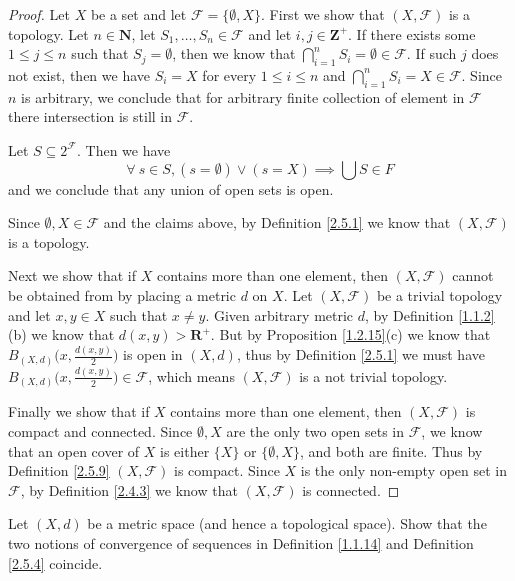 \begin{proof}
    Let \(X\) be a set and let \(\mathcal{F} = \{\emptyset, X\}\).
    First we show that \((X, \mathcal{F})\) is a topology.
    Let \(n \in \mathbf{N}\), let \(S_1, \dots, S_n \in \mathcal{F}\) and let \(i, j \in \mathbf{Z}^+\).
    If there exists some \(1 \leq j \leq n\) such that \(S_j = \emptyset\), then we know that \(\bigcap_{i = 1}^n S_i = \emptyset \in \mathcal{F}\).
    If such \(j\) does not exist, then we have \(S_i = X\) for every \(1 \leq i \leq n\) and \(\bigcap_{i = 1}^n S_i = X \in \mathcal{F}\).
    Since \(n\) is arbitrary, we conclude that for arbitrary finite collection of element in \(\mathcal{F}\) there intersection is still in \(\mathcal{F}\).

    Let \(S \subseteq 2^{\mathcal{F}}\).
    Then we have
    \[
        \forall\ s \in S, (s = \emptyset) \lor (s = X) \implies \bigcup S \in F
    \]
    and we conclude that any union of open sets is open.

    Since \(\emptyset, X \in \mathcal{F}\) and the claims above, by Definition \ref{2.5.1} we know that \((X, \mathcal{F})\) is a topology.

    Next we show that if \(X\) contains more than one element, then \((X, \mathcal{F})\) cannot be obtained from by placing a metric \(d\) on \(X\).
    Let \((X, \mathcal{F})\) be a trivial topology and let \(x, y \in X\) such that \(x \neq y\).
    Given arbitrary metric \(d\), by Definition \ref{1.1.2}(b) we know that \(d(x, y) > \mathbf{R}^+\).
    But by Proposition \ref{1.2.15}(c) we know that \(B_{(X, d)}\big(x, \frac{d(x, y)}{2}\big)\) is open in \((X, d)\), thus by Definition \ref{2.5.1} we must have \(B_{(X, d)}\big(x, \frac{d(x, y)}{2}\big) \in \mathcal{F}\), which means \((X, \mathcal{F})\) is a not trivial topology.

    Finally we show that if \(X\) contains more than one element, then \((X, \mathcal{F})\) is compact and connected.
    Since \(\emptyset, X\) are the only two open sets in \(\mathcal{F}\), we know that an open cover of \(X\) is either \(\{X\}\) or \(\{\emptyset, X\}\), and both are finite.
    Thus by Definition \ref{2.5.9} \((X, \mathcal{F})\) is compact.
    Since \(X\) is the only non-empty open set in \(\mathcal{F}\), by Definition \ref{2.4.3} we know that \((X, \mathcal{F})\) is connected.
\end{proof}

\begin{exercise}\label{ex 2.5.2}
    Let \((X, d)\) be a metric space
    (and hence a topological space).
    Show that the two notions of convergence of sequences in Definition \ref{1.1.14} and Definition \ref{2.5.4} coincide.
\end{exercise}

